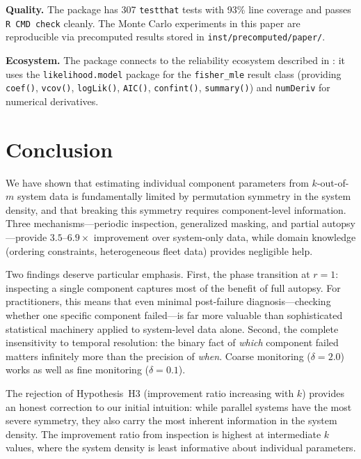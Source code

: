 \documentclass[12pt]{article}
\begin{document}
\textbf{Quality.}
The package has 307 \texttt{testthat} tests with 93\% line coverage and
passes \texttt{R CMD check} cleanly.  The Monte Carlo experiments in this
paper are reproducible via precomputed results stored in
\texttt{inst/precomputed/paper/}.

\textbf{Ecosystem.}
The package connects to the reliability ecosystem described in
\citet{MeekerEscobarPascual2022}: it uses the
\texttt{likelihood.model} package for the \texttt{fisher\_mle} result class
(providing \texttt{coef()}, \texttt{vcov()}, \texttt{logLik()},
\texttt{AIC()}, \texttt{confint()}, \texttt{summary()}) and
\texttt{numDeriv} \citep{numDeriv} for numerical derivatives.


\section{Conclusion}\label{sec:conclusion}

We have shown that estimating individual component parameters from
$k$-out-of-$m$ system data is fundamentally limited by permutation
symmetry in the system density, and that breaking this symmetry requires
component-level information.  Three mechanisms---periodic inspection,
generalized masking, and partial autopsy---provide $3.5$--$6.9\times$
improvement over system-only data, while domain knowledge (ordering
constraints, heterogeneous fleet data) provides negligible help.

Two findings deserve particular emphasis.  First, the phase transition at
$r = 1$: inspecting a single component captures most of the benefit of
full autopsy.  For practitioners, this means that even minimal post-failure
diagnosis---checking whether one specific component failed---is far more
valuable than sophisticated statistical machinery applied to system-level
data alone.  Second, the complete insensitivity to temporal resolution:
the binary fact of \emph{which} component failed matters infinitely more
than the precision of \emph{when}.  Coarse monitoring ($\delta = 2.0$)
works as well as fine monitoring ($\delta = 0.1$).

The rejection of Hypothesis~H3 (improvement ratio increasing with $k$)
provides an honest correction to our initial intuition: while parallel
systems have the most severe symmetry, they also carry the most inherent
information in the system density.  The improvement ratio from inspection
is highest at intermediate $k$ values, where the system density is least
informative about individual parameters.
\end{document}
